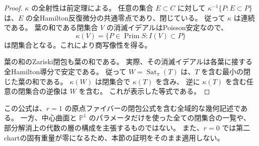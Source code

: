\begin{proof}
$\kappa$ の全射性は前定理による。
任意の集合 $E\subset C$ に対して
$\kappa^{-1}\{P:E\subset P\}$ は、$E$ の全Hamilton反復微分の共通零点であり、閉じている。
従って $\kappa$ は連続である。
葉の和である閉集合 $V$ の消滅イデアルはPoisson安定なので、
\[
 \kappa(V)=\{P\in\operatorname{Prim}S:I(V)\subset P\}
\]
は閉集合となる。これにより商写像性を得る。

葉の和のZariski閉包も葉の和である。
実際、その消滅イデアルは各葉に接する全Hamilton導分で安定である。
従って $W=\overline{\operatorname{Sat}_\pi(T)}$ は、$T$ を含む最小の閉じた葉の和である。
$\kappa(W)$ は閉集合で $\kappa(T)$ を含み、
逆に $\kappa(T)$ を含む任意の閉集合の逆像は $W$ を含む。
これが表示した等式である。
\end{proof}

この公式は、$r=1$ の原点ファイバーの閉包公式を含む全域的な幾何記述である。
一方、中心曲面と $\mathbb P^1$ のパラメータだけを使った全ての閉集合の一覧や、
部分解消上の代数の層の構成を主張するものではない。
また、$r=0$ では第二chartの固有重量が零になるため、本節の証明をそのまま適用しない。
